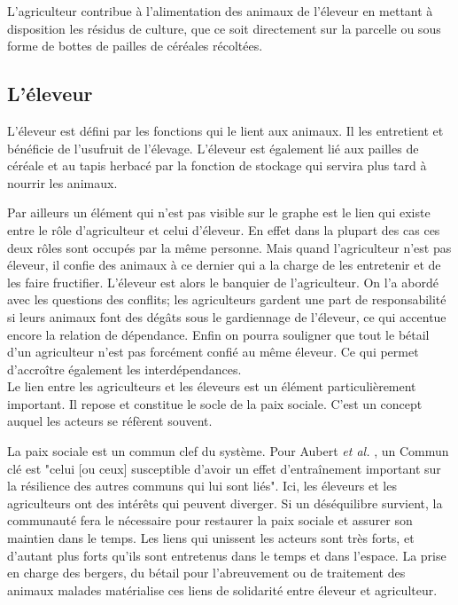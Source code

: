 L'agriculteur contribue à l'alimentation des animaux de l'éleveur en mettant à disposition les résidus de culture, que ce soit directement sur la parcelle ou sous forme de bottes de pailles de céréales récoltées.

\subsection{L'éleveur}
L'éleveur est défini par les fonctions qui le lient aux animaux. Il les entretient et bénéficie de l'usufruit de l'élevage. L'éleveur est également lié aux pailles de céréale et au tapis herbacé par la fonction de stockage qui servira plus tard à nourrir les animaux.

Par ailleurs un élément qui n'est pas visible sur le graphe est le lien qui existe entre le rôle d'agriculteur et celui d'éleveur. En effet dans la plupart des cas ces deux rôles sont occupés par la même personne. Mais quand l'agriculteur n'est pas éleveur, il confie des animaux à ce dernier qui a la charge de les entretenir et de les faire fructifier. L'éleveur est alors le banquier de l'agriculteur. On l'a abordé avec les questions des conflits; les agriculteurs gardent une part de responsabilité si leurs animaux font des dégâts sous le gardiennage de l'éleveur, ce qui accentue encore la relation de dépendance. Enfin on pourra souligner que tout le bétail d'un agriculteur n'est pas forcément confié au même éleveur. Ce qui permet d'accroître également les interdépendances.\\

Le lien entre les agriculteurs et les éleveurs est un élément particulièrement important. Il repose et constitue le socle de la paix sociale. C'est un concept auquel les acteurs se réfèrent souvent.

La paix sociale est un commun clef du système. Pour Aubert \textit{et al.} \cite{land_tenure_and_development_technical_committee_opportunities_2017}, un Commun clé est "celui [ou ceux] susceptible d’avoir un effet d’entraînement important sur la résilience des autres communs qui lui sont liés". Ici, les éleveurs et les agriculteurs ont des intérêts qui peuvent diverger. Si un déséquilibre survient, la communauté fera le nécessaire pour restaurer la paix sociale et assurer son maintien dans le temps. Les liens qui unissent les acteurs sont très forts, et d'autant plus forts qu'ils sont entretenus dans le temps et dans l'espace. La prise en charge des bergers, du bétail pour l'abreuvement ou de traitement des animaux malades matérialise ces liens de solidarité entre éleveur et agriculteur.

